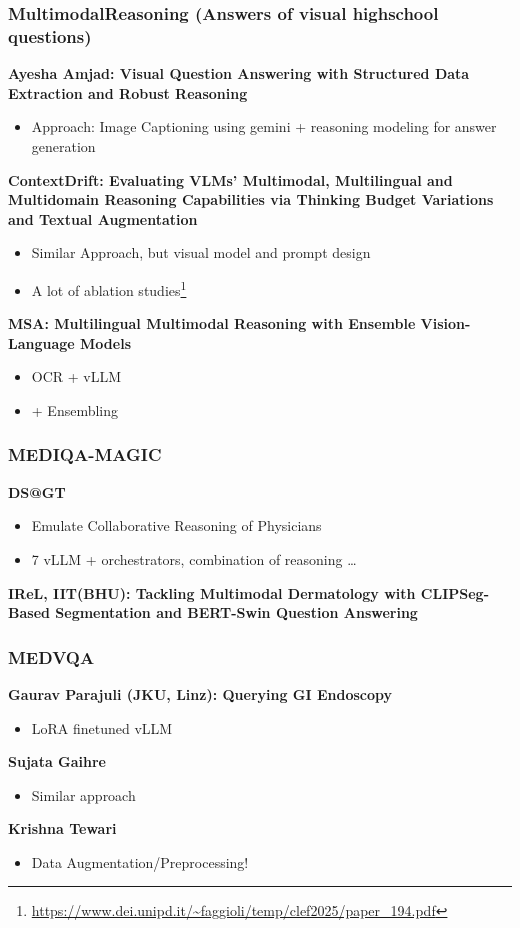 \documentclass[a4paper]{article}
\begin{document}
\subsubsection{MultimodalReasoning (Answers of visual highschool questions)}
\textbf{Ayesha Amjad: Visual Question Answering with Structured Data Extraction and Robust Reasoning}
\begin{itemize}
    \item Approach: Image Captioning using gemini + reasoning modeling for answer generation
\end{itemize}
\textbf{ContextDrift: Evaluating VLMs' Multimodal, Multilingual and Multidomain Reasoning Capabilities via Thinking Budget Variations and Textual Augmentation}
\begin{itemize}
    \item Similar Approach, but visual model and prompt design
    \item A lot of ablation studies\footnote{\url{https://www.dei.unipd.it/~faggioli/temp/clef2025/paper_194.pdf}}
\end{itemize}
\textbf{MSA: Multilingual Multimodal Reasoning with Ensemble Vision-Language Models}
\begin{itemize}
    \item OCR + vLLM
    \item + Ensembling
\end{itemize}

\subsubsection{MEDIQA-MAGIC}
\textbf{DS@GT}
\begin{itemize}
    \item Emulate Collaborative Reasoning of Physicians
    \item 7 vLLM + orchestrators, combination of reasoning \dots
\end{itemize}
\textbf{IReL, IIT(BHU): Tackling Multimodal Dermatology with CLIPSeg-Based Segmentation and BERT-Swin Question Answering}
\subsubsection{MEDVQA}
\textbf{Gaurav Parajuli (JKU, Linz): Querying GI Endoscopy}
\begin{itemize}
    \item LoRA finetuned vLLM
\end{itemize}
\textbf{Sujata Gaihre}
\begin{itemize}
    \item Similar approach
\end{itemize}
\textbf{Krishna Tewari}
\begin{itemize}
    \item Data Augmentation/Preprocessing!
\end{itemize}
\end{document}
